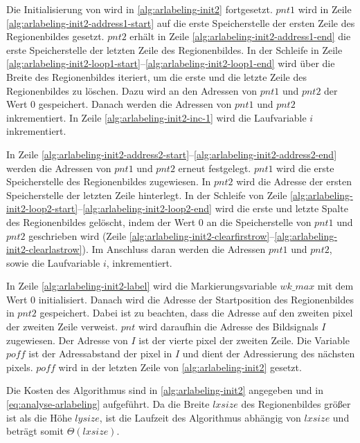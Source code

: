 Die Initialisierung von  wird in \autoref{alg:arlabeling-init2} fortgesetzt. $\mathit{pnt1}$ wird
 in Zeile \ref{alg:arlabeling-init2-address1-start} auf die erste Speicherstelle der ersten Zeile des Regionenbildes
 gesetzt. $\mathit{pnt2}$ erhält in Zeile \ref{alg:arlabeling-init2-address1-end} die erste Speicherstelle der
 letzten Zeile des Regionenbildes. In der Schleife in Zeile
 \ref{alg:arlabeling-init2-loop1-start}--\ref{alg:arlabeling-init2-loop1-end} wird über die Breite des Regionenbildes
 iteriert, um die erste und die letzte Zeile des Regionenbildes zu löschen. Dazu wird an den Adressen von
 $\mathit{pnt1}$ und $\mathit{pnt2}$ der Wert $0$ gespeichert. Danach werden die Adressen von $\mathit{pnt1}$ und
 $\mathit{pnt2}$ inkrementiert. In Zeile \ref{alg:arlabeling-init2-inc-1} wird die Laufvariable $i$ inkrementiert.



In Zeile \ref{alg:arlabeling-init2-address2-start}--\ref{alg:arlabeling-init2-address2-end} werden die Adressen
 von $\mathit{pnt1}$ und $\mathit{pnt2}$ erneut festgelegt. $\mathit{pnt1}$ wird die erste Speicherstelle des
 Regionenbildes zugewiesen. In $\mathit{pnt2}$ wird die Adresse der ersten Speicherstelle der letzten Zeile hinterlegt.
 In der Schleife von Zeile \ref{alg:arlabeling-init2-loop2-start}--\ref{alg:arlabeling-init2-loop2-end} wird die erste
 und letzte Spalte des Regionenbildes gelöscht, indem der Wert $0$ an die Speicherstelle von $\mathit{pnt1}$ und
 $\mathit{pnt2}$ geschrieben wird
 (Zeile \ref{alg:arlabeling-init2-clearfirstrow}--\ref{alg:arlabeling-init2-clearlastrow}). Im Anschluss daran werden
 die Adressen $\mathit{pnt1}$ und $\mathit{pnt2}$, sowie die Laufvariable $i$, inkrementiert.

In Zeile \ref{alg:arlabeling-init2-label} wird die Markierungsvariable $\mathit{wk\_max}$ mit dem Wert $0$
 initialisiert. Danach wird die Adresse der Startposition des Regionenbildes in $\mathit{pnt2}$ gespeichert. Dabei ist
 zu beachten, dass die Adresse auf den zweiten \gls{pixel} der zweiten Zeile verweist. $\mathit{pnt}$ wird daraufhin die
 Adresse des Bildsignals $I$ zugewiesen. Der Adresse von $I$ ist der vierte \gls{pixel} der zweiten Zeile. Die
 Variable $\mathit{poff}$ ist der Adressabstand der \gls{pixel} in $I$ und dient der Adressierung des nächsten
 \glspl{pixel}. $\mathit{poff}$ wird in der letzten Zeile von \autoref{alg:arlabeling-init2} gesetzt.

Die Kosten des Algorithmus sind in \autoref{alg:arlabeling-init2} angegeben und in \autoref{eq:analyse-arlabeling}
 aufgeführt. Da die Breite $\mathit{lxsize}$ des Regionenbildes größer ist als die Höhe $\mathit{lysize}$, ist die
 Laufzeit des Algorithmus abhängig von $\mathit{lxsize}$ und beträgt somit $\Theta{(\mathit{lxsize})}$.

